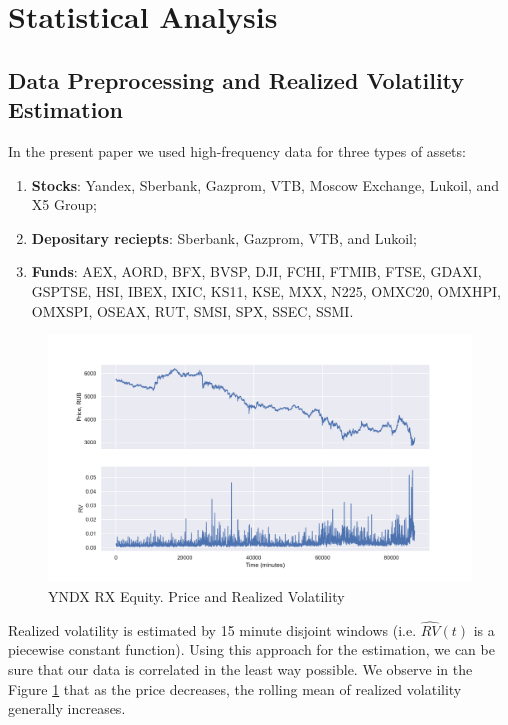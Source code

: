 \section{Statistical Analysis}
    \subsection{Data Preprocessing and Realized Volatility Estimation}
        In the present paper we used high-frequency data for three types of assets:
        \begin{enumerate}
            \item\textbf{Stocks}: Yandex, Sberbank, Gazprom, VTB, Moscow Exchange, Lukoil, and X5 Group;
            \item\textbf{Depositary reciepts}: Sberbank, Gazprom, VTB, and Lukoil;
            \item\textbf{Funds}: AEX, AORD, BFX, BVSP, DJI, FCHI, FTMIB, FTSE, GDAXI, GSPTSE, HSI, IBEX, IXIC, KS11, KSE, MXX, N225, OMXC20, OMXHPI, OMXSPI, OSEAX, RUT, SMSI, SPX, SSEC, SSMI.
        \end{enumerate}

        \begin{figure}[htbp]
            \includegraphics[width=\textwidth]{fig/YNDX RX Equity RVol.pdf}
            \caption{YNDX RX Equity. Price and Realized Volatility}
            \label{fig:priceRV} 
        \end{figure}

        Realized volatility is estimated by 15 minute disjoint windows (i.e. $\hat{RV}(t)$ is a piecewise constant function).
        Using this approach for the estimation, we can be sure that our data is correlated in the least way possible.
        We observe in the Figure \ref{fig:priceRV} that as the price decreases, the rolling mean of realized 
        volatility generally increases.
        
